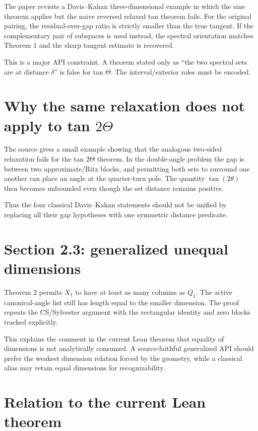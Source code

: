 The paper revisits a Davis--Kahan three-dimensional example in which the sine theorem applies but the naive reversed relaxed tan theorem fails. For the original pairing, the residual-over-gap ratio is strictly smaller than the true tangent. If the complementary pair of subspaces is used instead, the spectral orientation matches Theorem 1 and the sharp tangent estimate is recovered.

This is a major API constraint. A theorem stated only as ``the two spectral sets are at distance $\delta$'' is false for tan $\Theta$. The interval/exterior roles must be encoded.

\section{Why the same relaxation does not apply to tan $2\Theta$}

The source gives a small example showing that the analogous two-sided relaxation fails for the tan $2\Theta$ theorem. In the double-angle problem the gap is between two approximate/Ritz blocks, and permitting both sets to surround one another can place an angle at the quarter-turn pole. The quantity $\tan(2\theta)$ then becomes unbounded even though the set distance remains positive.

Thus the four classical Davis--Kahan statements should not be unified by replacing all their gap hypotheses with one symmetric distance predicate.

\section{Section 2.3: generalized unequal dimensions}


Theorem 2 permits $X_1$ to have at least as many columns as $Q_1$. The active canonical-angle list still has length equal to the smaller dimension. The proof repeats the CS/Sylvester argument with the rectangular identity and zero blocks tracked explicitly.

This explains the comment in the current Lean theorem that equality of dimensions is not analytically consumed. A source-faithful generalized API should prefer the weakest dimension relation forced by the geometry, while a classical alias may retain equal dimensions for recognizability.

\section{Relation to the current Lean theorem}

